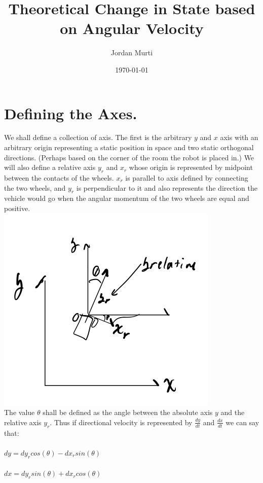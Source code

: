 \documentclass[a4paper,12pt]{article}
\begin{document}
     \title{Theoretical Change in State based on Angular Velocity}
     \author{Jordan Murti}
     \date{\today}
     \maketitle

\section{Defining the Axes.}

We shall define a collection of axis. The first is the arbitrary $y$ and $x$ axis with an arbitrary origin representing a static position in space and two static orthogonal directions. (Perhaps based on the corner of the room the robot is placed in.) We will also define a relative axis $y_{r}$ and $x_{r}$ whose origin is represented by midpoint between the contacts of the wheels. $x_{r}$ is parallel to axis defined by connecting the two wheels, and $y_{r}$ is perpendicular to it and also represents the direction the vehicle would go when the angular momentum of the two wheels are equal and positive.\\
\includegraphics[scale=.75]{axis}\\
The value $\theta$ shall be defined as the angle between the absolute axis $y$ and the relative axis $y_{r}$. Thus if directional velocity is represented by $\frac{dy}{dt}$ and $\frac{dx}{dt}$ we can say that:\\\\
$dy = dy_r cos(\theta) - dx_r sin(\theta)$\\\\
$dx = dy_r sin(\theta) + dx_r cos(\theta)$\\\\
\end{document}

